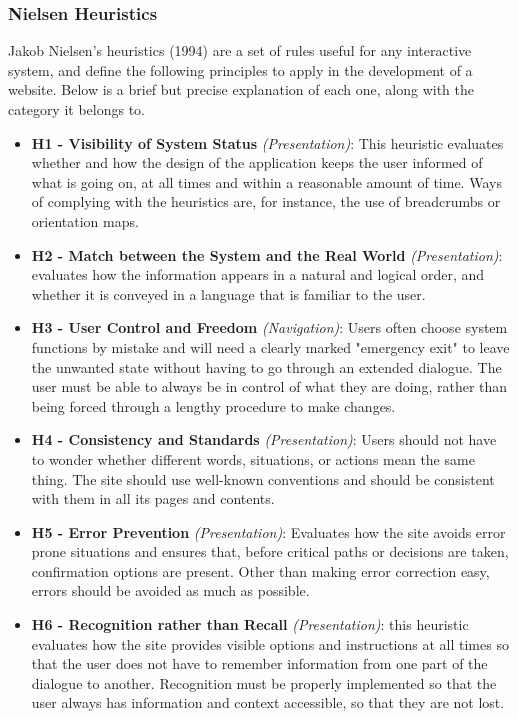 \documentclass[11pt]{article} %
\begin{document}
\subsubsection{Nielsen Heuristics}
Jakob Nielsen's heuristics (1994) are a set of rules useful for any interactive system, and define the following principles to apply in the development of a website.
Below is a brief but precise explanation of each one, along with the category it belongs to.
\begin{itemize}
    \item \textbf{H1 - Visibility of System Status} \textit{(Presentation)}: This heuristic evaluates whether and how the design of the application keeps the user informed of what is going on, at all times and within a reasonable amount of time. Ways of complying with the heuristics are, for instance, the use of breadcrumbs or orientation maps. 
    \item \textbf{H2 - Match between the System and the Real World} \textit{(Presentation)}: evaluates how the information appears in a natural and logical order, and whether it is conveyed in a language that is familiar to the user.
    \item \textbf{H3 - User Control and Freedom} \textit{(Navigation)}: Users often choose system functions by mistake and will need a clearly marked "emergency exit" to leave the unwanted state without having to go through an extended dialogue. The user must be able to always be in control of what they are doing, rather than being forced through a lengthy procedure to make changes.
    \item \textbf{H4 - Consistency and Standards} \textit{(Presentation)}: Users should not have to wonder whether different words, situations, or actions mean the same thing. The site should use well-known conventions and should be consistent with them in all its pages and contents.
    \item \textbf{H5 - Error Prevention} \textit{(Presentation)}: Evaluates how the site avoids error prone situations and ensures that, before critical paths or decisions are taken, confirmation options are present. 
    Other than making error correction easy, errors should be avoided as much as possible. 
    \item \textbf{H6 - Recognition rather than Recall} \textit{(Presentation)}: this heuristic evaluates how the site provides visible options and instructions at all times so that the user does not have to remember information from one part of the dialogue to another. Recognition must be properly implemented so that the user always has information and context accessible, so that they are not lost.

\end{itemize}
\end{document}
